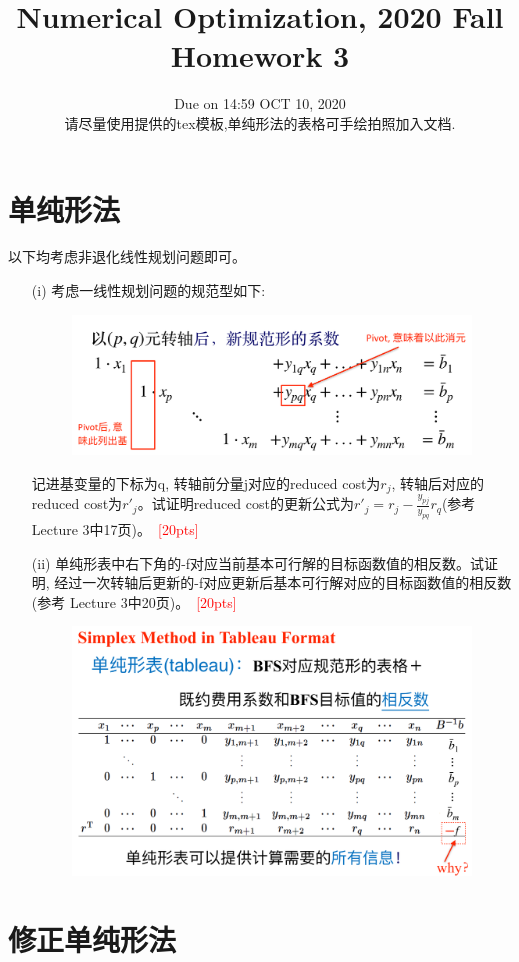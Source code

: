 \documentclass[10pt]{article}
\begin{document}
	
\title{	Numerical Optimization, 2020 Fall\\Homework 3}
\date{Due on 14:59 OCT 10, 2020\\
	请尽量使用提供的tex模板,单纯形法的表格可手绘拍照加入文档.
	}
\maketitle

\section{单纯形法}
以下均考虑非退化线性规划问题即可。
\begin{enumerate}
	\item[(i)] 考虑一线性规划问题的规范型如下:
	\begin{figure}[H]
		\centering
		\includegraphics[width=0.55\linewidth]{hw3_1.png}
		\label{fig.prob1}
	\end{figure}
	记进基变量的下标为q, 转轴前分量j对应的reduced cost为$r_j$, 转轴后对应的reduced cost为$r'_j$。试证明reduced cost的更新公式为$r'_j=r_j - \frac{y_{pj}}{y_{pq}} r_q$(参考 Lecture 3中17页)。~\textcolor{red}{[20pts]}
	\item[(ii)] 单纯形表中右下角的-f对应当前基本可行解的目标函数值的相反数。试证明, 经过一次转轴后更新的-f对应更新后基本可行解对应的目标函数值的相反数 (参考 Lecture 3中20页)。~\textcolor{red}{[20pts]}
	\begin{figure}[H]
		\centering
		\includegraphics[width=0.55\linewidth]{hw3_2.png}
		\label{fig.prob2}
	\end{figure}
\end{enumerate}


\section{修正单纯形法}
\end{document}
